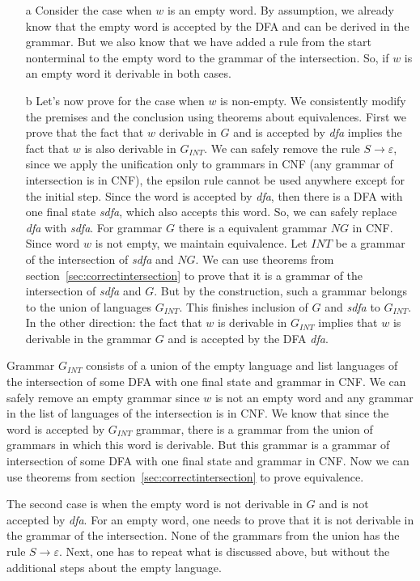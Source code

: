 \begin{enumerate}
\item[a] Consider the case when $w$ is an empty word.
By assumption, we already know that the empty word is accepted by the DFA and can be derived in the grammar. But we also know that we have added a rule from the start nonterminal to the empty word to the grammar of the intersection. So, if $w$ is an empty word it derivable in both cases.
\item[b] Let's now prove for the case when $w$ is non-empty.
We consistently modify the premises and the conclusion using theorems about equivalences. First we prove that the fact that $w$ derivable in $G$ and is accepted by \textit{dfa} implies the fact that $w$ is also derivable in $G_{INT}$. We can safely remove the rule $S \to \varepsilon$, since we apply the unification only to grammars in CNF (any grammar of intersection is in CNF), the epsilon rule cannot be used anywhere except for the initial step.
Since the word is accepted by \textit{dfa}, then there is a DFA with one final state \textit{sdfa}, which also accepts this word. So, we can safely replace \textit{dfa} with \textit{sdfa}. 
For grammar $G$ there is a equivalent grammar $NG$ in CNF. Since word $w$ is not empty, we maintain equivalence.
Let $INT$ be a grammar of the intersection of \textit{sdfa} and $NG$. We can use theorems from section~\ref{sec:correctintersection} to prove that it is a grammar of the intersection of \textit{sdfa} and $G$. 
But by the construction, such a grammar belongs to the union of languages $G_{INT}$. This finishes inclusion of $G$ and \textit{sdfa} to $G_{INT}$.
In the other direction: the fact that $w$ is derivable in $G_{INT}$ implies that $w$ is derivable in the grammar $G$ and is accepted by the DFA \textit{dfa}. 
\end{enumerate}

Grammar $G_{INT}$ consists of a union of the empty language and list languages of the intersection of some DFA with one final state and grammar in CNF. We can safely remove an empty grammar since $w$ is not an empty word and any grammar in the list of languages of the intersection is in CNF.
We know that since the word is accepted by $G_{INT}$ grammar, there is a grammar from the union of grammars in which this word is derivable.
But this grammar is a grammar of intersection of some DFA with one final state and grammar in CNF. Now we can use theorems from section~\ref{sec:correctintersection} to prove equivalence.

The second case is when the empty word is not derivable in $G$ and is not accepted by \textit{dfa}.
For an empty word, one needs to prove that it is not derivable in the grammar of the intersection. 
None of the grammars from the union has the rule $S \to \varepsilon$. 
Next, one has to repeat what is discussed above, but without the additional steps about the empty language.
 	